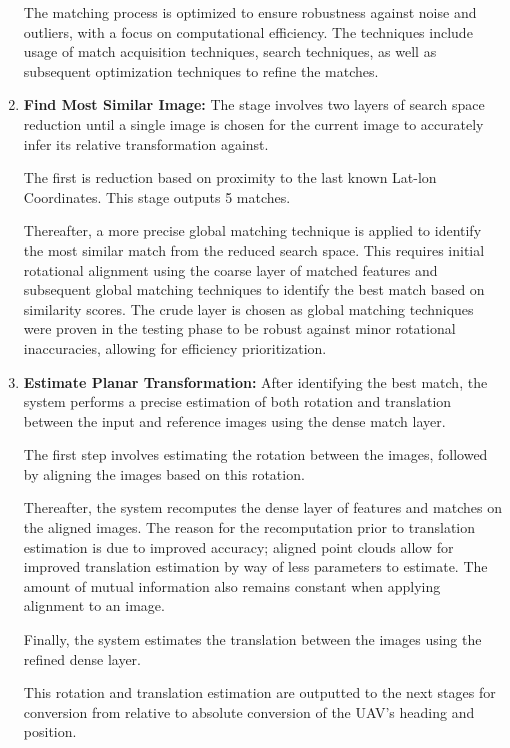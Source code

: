 \begin{enumerate}
    The matching process is optimized to ensure robustness against noise and outliers, with a focus on computational efficiency. The techniques include usage of match acquisition techniques, search techniques, as well as subsequent optimization techniques to refine the matches.
    
    \item \textbf{Find Most Similar Image:}  
    The stage involves two layers of search space reduction until a single image is chosen for the current image to accurately infer its relative transformation against. 
    
    The first is reduction based on proximity to the last known Lat-lon Coordinates. This stage outputs 5 matches. 
    
    Thereafter, a more precise global matching technique is applied to identify the most similar match from the reduced search space. This requires initial rotational alignment using the coarse layer of matched features and subsequent global matching techniques to identify the best match based on similarity scores. The crude layer is chosen as global matching techniques were proven in the testing phase to be robust against minor rotational inaccuracies, allowing for efficiency prioritization. 


    \item \textbf{Estimate Planar Transformation:}  
    After identifying the best match, the system performs a precise estimation of both rotation and translation between the input and reference images using the dense match layer. 
    
    The first step involves estimating the rotation between the images, followed by aligning the images based on this rotation. 
    
    Thereafter, the system recomputes the dense layer of features and matches on the aligned images. The reason for the recomputation prior to translation estimation is due to improved accuracy; aligned point clouds allow for improved translation estimation by way of less parameters to estimate. The amount of mutual information also remains constant when applying alignment to an image. 

    Finally, the system estimates the translation between the images using the refined dense layer. 

    This rotation and translation estimation are outputted to the next stages for conversion from relative to absolute conversion of the UAV's heading and position. 


\end{enumerate}
